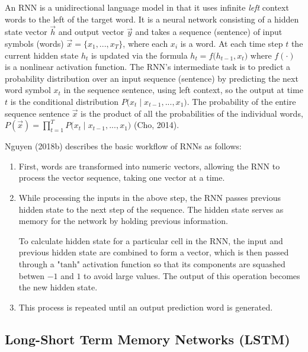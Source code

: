 An RNN is a unidirectional language model in that it uses infinite \emph{left} context words to the left of the target word. It is a neural network consisting of a hidden state vector $\overrightarrow{h}$ and output vector $\overrightarrow{y}$ and takes a sequence (sentence) of input symbols (words) $\overrightarrow{x} = \{ x_1, ..., x_T\}$, where each $x_i$ is a word. At each time step $t$ the current hidden state $h_t$ is updated via the formula $h_t = f \Big( h_{t-1}, x_t \Big)$ where $f(\cdot)$ is a nonlinear activation function. The RNN's intermediate task is to predict a probability distribution over an input sequence (sentence) by predicting the next word symbol $x_t$ in the sequence sentence, using left context, so the output at time $t$ is the conditional distribution $P \Big(x_t \; | \; x_{t-1}, ..., x_1 \Big)$. The probability of the entire sequence sentence $\overrightarrow{x}$ is the product of all the probabilities of the individual words, $P(\overrightarrow{x}) = \prod_{t=1}^T P \Big(x_t \; | \; x_{t-1}, ..., x_1 \Big)$ (Cho, 2014). 

Nguyen (2018b) describes the basic workflow of RNNs as follows: 

\begin{enumerate}
    \item First, words are transformed into numeric vectors, allowing the RNN to process the vector sequence, taking one vector at a time. 
    
    \item While processing the inputs in the above step, the RNN passes previous hidden state to the next step of the sequence. The hidden state serves as memory for the network by holding previous information. 
    
    To calculate hidden state for a particular cell in the RNN, the input and previous hidden state are combined to form a vector, which is then passed through a $\text{"tanh"}$ activation function so that its components are squashed betwen $-1$ and $1$ to avoid large values. The output of this operation becomes the new hidden state. 
    
    \item This process is repeated until an output prediction word is generated. 
    
\end{enumerate}


    
\subsection{Long-Short Term Memory Networks (LSTM)}

